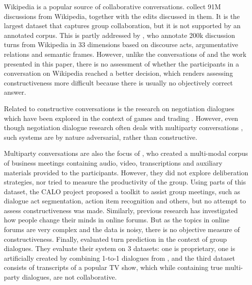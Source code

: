 \documentclass[acmsmall,manuscript,screen]{acmart}
\begin{document}
Wikipedia is a popular source of collaborative conversations. 
\citet{hua2018wikiconv} collect 91M discussions from Wikipedia, together with the  edits discussed in them. It is the largest dataset that captures group collaboration, but it is not supported by an annotated corpus.
This is partly addressed by \citet{al-khatib-etal-2018-modeling}, who annotate 
200k discussion turns from Wikipedia in 33 dimensions based on discourse acts, argumentative relations and semantic frames. However, unlike the conversations of
\citet{niculae2016conversational} and the work presented in this paper, there is no assessment of whether the participants in a conversation on Wikipedia reached a better decision,
which renders assessing constructiveness more difficult because there is usually no objectively correct answer.

\par

Related to constructive conversations is the research on negotiation dialogues which have been explored in the context of games \citep{keizer2017evaluating, cuayahuitl2015strategic} and trading \citep{hehe-negotiation, deal-nodeal}. However, even though negotiation dialogue research often deals with multiparty conversations \cite{cuayahuitl2015strategic}, such systems are by nature adversarial, rather than constructive. 

Multiparty conversations are also the focus of \citet{carletta2005ami}, who created a multi-modal corpus of business meetings containing audio, video, transcriptions and auxiliary materials provided to the participants. However, they did not explore deliberation strategies, nor tried to measure the productivity of the group. 
Using parts of this dataset, the CALO project \cite{tur2010calo} proposed a toolkit to assist group meetings, such as dialogue act segmentation, action item recognition and others, but no attempt to assess constructiveness was made. Similarly, previous research \citep{zeng2020changed, hidey-etal-2017-analyzing} has investigated how people change their minds in online forums. But as the topics in online forums are very complex and the data is noisy, there is no objective measure of constructiveness.
Finally, \citet{de2019learning} evaluated turn prediction in the context of group dialogues. They evaluate their system on 3 datasets: one is proprietary, one is artificially created by combining 1-to-1 dialogues from \citet{budzianowski2018multiwoz},
and the third dataset consists of transcripts of a popular TV show, which while containing true multi-party dialogues, are not collaborative.
\end{document}
